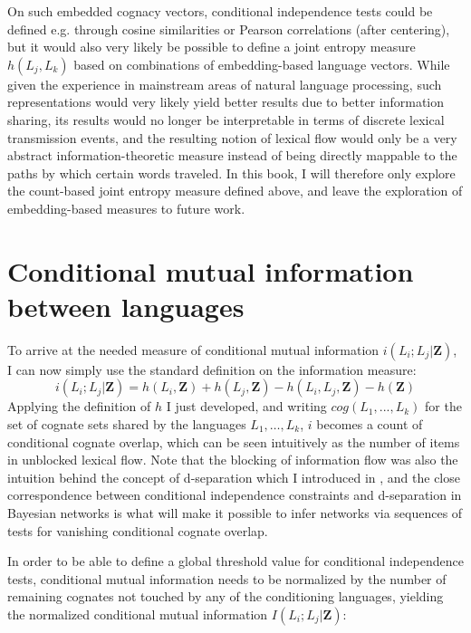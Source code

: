 On such embedded cognacy vectors, conditional independence tests could be defined e.g. through cosine similarities or Pearson correlations (after centering), but it would also very likely be possible to define a joint entropy measure $h(L_j,L_k)$ based on combinations of embedding-based language vectors. While given the experience in mainstream areas of natural language processing, such representations would very likely yield better results due to better information sharing, its results would no longer be interpretable in terms of discrete lexical transmission events, and the resulting notion of lexical flow would only be a very abstract information-theoretic measure instead of being directly mappable to the paths by which certain words traveled. In this book, I will therefore only explore the count-based joint entropy measure defined above, and leave the exploration of embedding-based measures to future work.

\section{Conditional mutual information between languages}\label{sec:6.3}
To arrive at the needed measure of conditional mutual information $i(L_i;L_j|\mathbf{Z})$, I can now simply use the standard definition on the information measure: 
\begin{equation*}
 i(L_i;L_j|\mathbf{Z}) = h(L_i,\mathbf{Z}) + h(L_j,\mathbf{Z}) - h(L_i,L_j,\mathbf{Z}) - h(\mathbf{Z})
\end{equation*}
Applying the definition of $h$ I just developed, and writing $cog(L_1,...,L_k)$ for the set of cognate sets shared by the languages $L_1,\dots,L_k$, $i$ becomes a count of conditional cognate overlap, which can be seen intuitively as the number of items in unblocked lexical flow. Note that the blocking of information flow was also the intuition behind the concept of d-separation which I introduced in , and the close correspondence between conditional independence constraints and d-separation in Bayesian networks is what will make it possible to infer networks via sequences of tests for vanishing conditional cognate overlap.

In order to be able to define a global threshold value for conditional independence tests, conditional mutual information needs to be normalized by the number of remaining cognates not touched by any of the conditioning languages, yielding the normalized conditional mutual information $I(L_i;L_j|\mathbf{Z})$:

